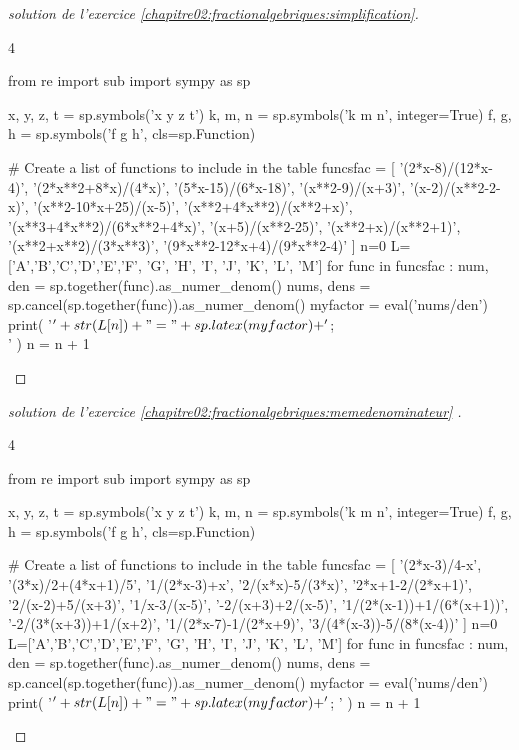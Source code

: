 \begin{proof}[solution de l'exercice \ref{chapitre02:fractionalgebriques:simplification}] \hfill 
\begin{multicols}{4} 
\begin{pycode}
from re import sub
import sympy as sp

x, y, z, t = sp.symbols('x y z t')
k, m, n = sp.symbols('k m n', integer=True)
f, g, h = sp.symbols('f g h', cls=sp.Function)

# Create a list of functions to include in the table
funcsfac = [  
'(2*x-8)/(12*x-4)', 
'(2*x**2+8*x)/(4*x)',
'(5*x-15)/(6*x-18)',
'(x**2-9)/(x+3)',
'(x-2)/(x**2-2-x)',
'(x**2-10*x+25)/(x-5)',
'(x**2+4*x**2)/(x**2+x)',
'(x**3+4*x**2)/(6*x**2+4*x)',
'(x+5)/(x**2-25)',
'(x**2+x)/(x**2+1)',
'(x**2+x**2)/(3*x**3)',
'(9*x**2-12*x+4)/(9*x**2-4)'  
]
n=0
L=['A','B','C','D','E','F', 'G', 'H', 'I', 'J', 'K', 'L', 'M']
for func in funcsfac :  
	num, den = sp.together(func).as_numer_denom()
	nums, dens = sp.cancel(sp.together(func)).as_numer_denom()
	myfactor =  eval('nums/den')
	print( '$'+ str(L[n])  + "=" + sp.latex(myfactor) + '$; \\ \n' ) 
	n     = n + 1
\end{pycode} 
\end{multicols}
\end{proof}
\begin{proof}[solution de l'exercice \ref{chapitre02:fractionalgebriques:memedenominateur} ] \hfill 
\begin{multicols}{4} 
\begin{pycode}
from re import sub
import sympy as sp

x, y, z, t = sp.symbols('x y z t')
k, m, n = sp.symbols('k m n', integer=True)
f, g, h = sp.symbols('f g h', cls=sp.Function)

# Create a list of functions to include in the table
funcsfac = [  
'(2*x-3)/4-x',
'(3*x)/2+(4*x+1)/5',
'1/(2*x-3)+x',
'2/(x*x)-5/(3*x)',
'2*x+1-2/(2*x+1)',
'2/(x-2)+5/(x+3)',
'1/x-3/(x-5)',
'-2/(x+3)+2/(x-5)',
'1/(2*(x-1))+1/(6*(x+1))',
'-2/(3*(x+3))+1/(x+2)',
'1/(2*x-7)-1/(2*x+9)',
'3/(4*(x-3))-5/(8*(x-4))' 
]
n=0
L=['A','B','C','D','E','F', 'G', 'H', 'I', 'J', 'K', 'L', 'M']
for func in funcsfac :  
	num, den = sp.together(func).as_numer_denom()
	nums, dens = sp.cancel(sp.together(func)).as_numer_denom()
	myfactor =  eval('nums/den')
	print( '$'+ str(L[n])  + "=" + sp.latex(myfactor) + '$; ' ) 
	n     = n + 1
\end{pycode}
\end{multicols}
\end{proof}
%	
